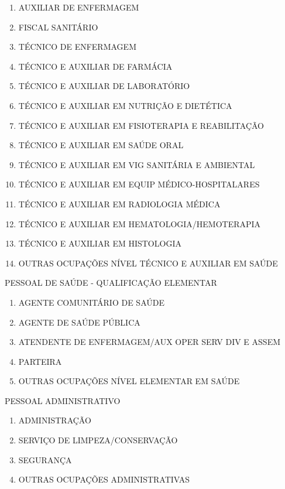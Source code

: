 \documentclass[a4paper,11pt]{article}
\begin{document}
\begin{enumerate}
    \item AUXILIAR DE ENFERMAGEM
    \item FISCAL SANITÁRIO
    \item TÉCNICO DE ENFERMAGEM
    \item TÉCNICO E AUXILIAR DE FARMÁCIA
    \item TÉCNICO E AUXILIAR DE LABORATÓRIO
    \item TÉCNICO E AUXILIAR EM NUTRIÇÃO E DIETÉTICA
    \item TÉCNICO E AUXILIAR EM FISIOTERAPIA E REABILITAÇÃO
    \item TÉCNICO E AUXILIAR EM SAÚDE ORAL
    \item TÉCNICO E AUXILIAR EM VIG SANITÁRIA E AMBIENTAL
    \item TÉCNICO E AUXILIAR EM EQUIP MÉDICO-HOSPITALARES
    \item TÉCNICO E AUXILIAR EM RADIOLOGIA MÉDICA
    \item TÉCNICO E AUXILIAR EM HEMATOLOGIA/HEMOTERAPIA
    \item TÉCNICO E AUXILIAR EM HISTOLOGIA
    \item OUTRAS OCUPAÇÕES NÍVEL TÉCNICO E AUXILIAR EM SAÚDE
\end{enumerate}
PESSOAL DE SAÚDE - QUALIFICAÇÃO ELEMENTAR
\begin{enumerate}
    \item AGENTE COMUNITÁRIO DE SAÚDE
    \item AGENTE DE SAÚDE PÚBLICA
    \item ATENDENTE DE ENFERMAGEM/AUX OPER SERV DIV E ASSEM
    \item PARTEIRA
    \item OUTRAS OCUPAÇÕES NÍVEL ELEMENTAR EM SAÚDE
\end{enumerate}
PESSOAL ADMINISTRATIVO
\begin{enumerate}
    \item ADMINISTRAÇÃO
    \item SERVIÇO DE LIMPEZA/CONSERVAÇÃO
    \item SEGURANÇA
    \item OUTRAS OCUPAÇÕES ADMINISTRATIVAS
\end{enumerate}
\end{document}
